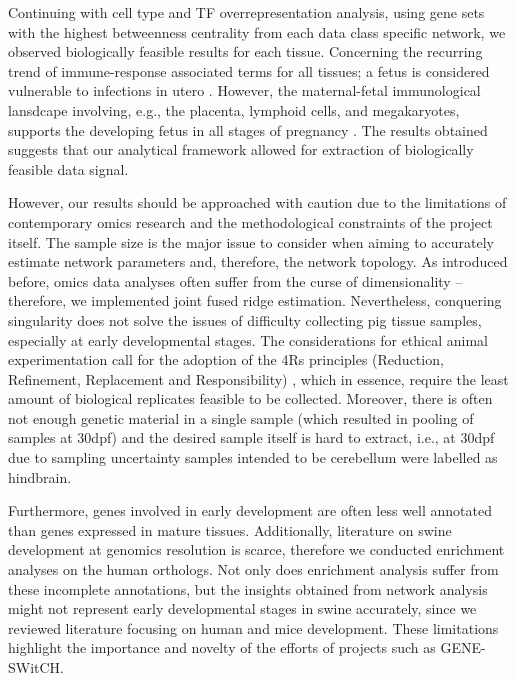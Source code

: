 \documentclass[
	a4paper, %
	10pt, %
	unnumberedsections, %
	twoside, %
]{LTJournalArticle}
\begin{document}
Continuing with cell type and TF overrepresentation analysis,
using gene sets with the highest betweenness centrality
from each data class specific network, 
we observed biologically feasible results for each tissue.
Concerning the recurring trend of immune-response associated
terms for all tissues; a fetus is considered vulnerable
to infections in utero \autocite{luculligan2020a}. However, the
maternal-fetal
immunological lansdcape involving, e.g., the placenta, lymphoid cells,
and megakaryotes, supports the developing fetus
in all stages of pregnancy \autocite{hussain2022a}. The results obtained
suggests that our analytical framework allowed for extraction of
biologically feasible data signal.

However, our results should be approached with caution due to the limitations 
of contemporary omics research and the methodological constraints of the project itself. 
The sample size is the major issue to consider when aiming to accurately estimate network parameters and, therefore, 
the network topology. As introduced before, omics data analyses often suffer from the curse 
of dimensionality – therefore, we implemented joint fused ridge estimation. Nevertheless, 
conquering singularity does not solve the issues of difficulty collecting pig tissue samples, 
especially at early developmental stages. The considerations for ethical animal 
experimentation call for the adoption of the 4Rs principles (Reduction, Refinement, Replacement and Responsibility) 
\autocite{kiani2022a}, which in essence, require the least amount of biological replicates feasible to be 
collected. Moreover, there is often not enough genetic material in a single sample (which resulted in 
pooling of samples at 30dpf) and the desired sample itself is hard to extract, i.e., at 30dpf 
due to sampling uncertainty samples intended to be
cerebellum were labelled as hindbrain. 

Furthermore, genes involved in early development are often less well annotated than genes expressed 
in mature tissues. Additionally, literature on swine development at genomics resolution is scarce,
therefore we conducted enrichment analyses on the human orthologs. Not only does enrichment 
analysis suffer from these incomplete annotations, but 
the insights obtained from network analysis might not represent early developmental stages 
in swine accurately,
since we reviewed literature focusing on human and mice development. 
These limitations highlight the importance and novelty of the efforts of projects such as GENE-SWitCH. 
\end{document}
